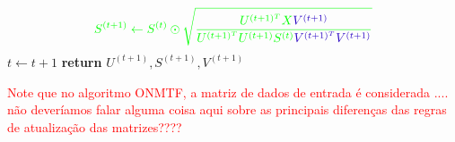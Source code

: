 \documentclass[
    12pt,                %
    oneside,            %
    a4paper,            %
    english,            %
    brazil                %
    ]{abntex2ppgsi}
\begin{document}
\begin{algorithm}
\begin{algorithmic}[1]
                    \begin{equation}
                    \label{eq:onmtf:updateS}
                        \textcolor{green}{S^{(t+1)} \gets S^{(t)} \odot \sqrt{\frac{ U^{(t+1)^T} X \textcolor{blue}{V^{(t+1)}} }{ U^{(t+1)^T} U^{(t+1)} S^{(t)} \textcolor{blue}{V^{(t+1)^T} V^{(t+1)}} }}}    \nonumber
                    \end{equation}                \State $t \gets t + 1$
            \EndWhile\label{euclidendwhile}
            \State \textbf{return} $U^{(t+1)}, S^{(t+1)}, V^{(t+1)}$
        \EndFunction
    \end{algorithmic}
\end{algorithm}


\textcolor{red}{Note que no algoritmo ONMTF, a matriz de dados de entrada é considerada .... não deveríamos falar alguma coisa aqui sobre as principais diferenças das regras de atualização das matrizes????}





\end{document}
